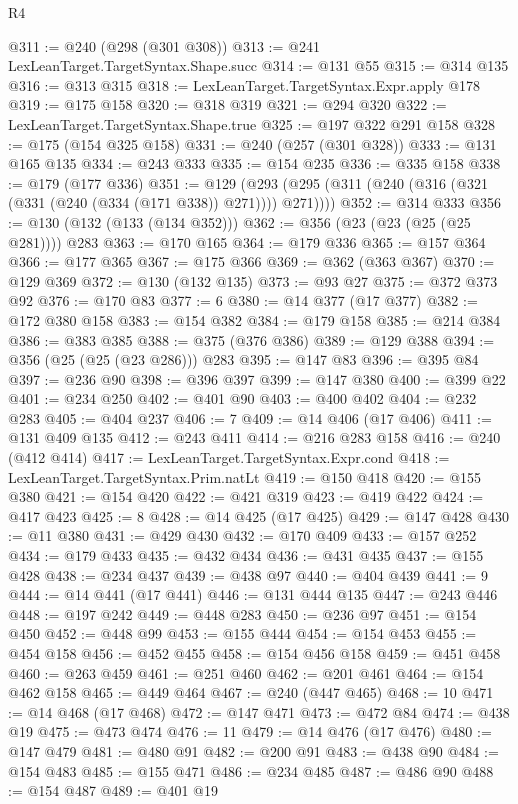 \begin{lexlean}{R4}
\begin{coremodule}
@311 := @240 (@298 (@301 @308))
@313 := @241 LexLeanTarget.TargetSyntax.Shape.succ
@314 := @131 @55
@315 := @314 @135
@316 := @313 @315
@318 := LexLeanTarget.TargetSyntax.Expr.apply @178
@319 := @175 @158
@320 := @318 @319
@321 := @294 @320
@322 := LexLeanTarget.TargetSyntax.Shape.true
@325 := @197 @322 @291 @158
@328 := @175 (@154 @325 @158)
@331 := @240 (@257 (@301 @328))
@333 := @131 @165 @135
@334 := @243 @333
@335 := @154 @235
@336 := @335 @158
@338 := @179 (@177 @336)
@351 := @129 (@293 (@295 (@311 (@240 (@316 (@321 (@331 (@240 (@334 (@171 @338)) @271)))) @271))))
@352 := @314 @333
@356 := @130 (@132 (@133 (@134 @352)))
@362 := @356 (@23 (@23 (@25 (@25 @281)))) @283
@363 := @170 @165
@364 := @179 @336
@365 := @157 @364
@366 := @177 @365
@367 := @175 @366
@369 := @362 (@363 @367)
@370 := @129 @369
@372 := @130 (@132 @135)
@373 := @93 @27
@375 := @372 @373 @92
@376 := @170 @83
@377 := 6
@380 := @14 @377 (@17 @377)
@382 := @172 @380 @158
@383 := @154 @382
@384 := @179 @158
@385 := @214 @384
@386 := @383 @385
@388 := @375 (@376 @386)
@389 := @129 @388
@394 := @356 (@25 (@25 (@23 @286))) @283
@395 := @147 @83
@396 := @395 @84
@397 := @236 @90
@398 := @396 @397
@399 := @147 @380
@400 := @399 @22
@401 := @234 @250
@402 := @401 @90
@403 := @400 @402
@404 := @232 @283
@405 := @404 @237
@406 := 7
@409 := @14 @406 (@17 @406)
@411 := @131 @409 @135
@412 := @243 @411
@414 := @216 @283 @158
@416 := @240 (@412 @414)
@417 := LexLeanTarget.TargetSyntax.Expr.cond
@418 := LexLeanTarget.TargetSyntax.Prim.natLt
@419 := @150 @418
@420 := @155 @380
@421 := @154 @420
@422 := @421 @319
@423 := @419 @422
@424 := @417 @423
@425 := 8
@428 := @14 @425 (@17 @425)
@429 := @147 @428
@430 := @11 @380
@431 := @429 @430
@432 := @170 @409
@433 := @157 @252
@434 := @179 @433
@435 := @432 @434
@436 := @431 @435
@437 := @155 @428
@438 := @234 @437
@439 := @438 @97
@440 := @404 @439
@441 := 9
@444 := @14 @441 (@17 @441)
@446 := @131 @444 @135
@447 := @243 @446
@448 := @197 @242
@449 := @448 @283
@450 := @236 @97
@451 := @154 @450
@452 := @448 @99
@453 := @155 @444
@454 := @154 @453
@455 := @454 @158
@456 := @452 @455
@458 := @154 @456 @158
@459 := @451 @458
@460 := @263 @459
@461 := @251 @460
@462 := @201 @461
@464 := @154 @462 @158
@465 := @449 @464
@467 := @240 (@447 @465)
@468 := 10
@471 := @14 @468 (@17 @468)
@472 := @147 @471
@473 := @472 @84
@474 := @438 @19
@475 := @473 @474
@476 := 11
@479 := @14 @476 (@17 @476)
@480 := @147 @479
@481 := @480 @91
@482 := @200 @91
@483 := @438 @90
@484 := @154 @483
@485 := @155 @471
@486 := @234 @485
@487 := @486 @90
@488 := @154 @487
@489 := @401 @19

\end{coremodule}
\end{lexlean}

